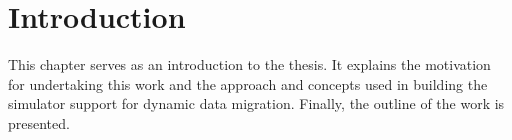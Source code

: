 \documentclass{listhesis}
\begin{document}
\maketitle
\cleardoublepage

\makeabstract
\clearpage

\tableofcontents
\clearpage
\listoffigures
\clearpage
\listoftables
\clearpage


\chapter{Introduction}
This chapter serves as an introduction to the thesis. It explains the motivation for undertaking this work and the approach and concepts used in building the simulator support for dynamic data migration. Finally, the outline of the work is presented.
\end{document}
